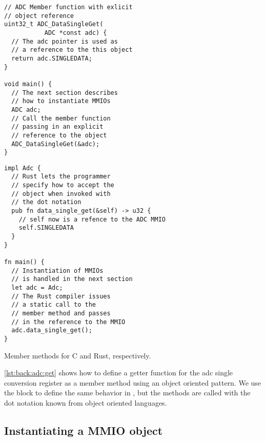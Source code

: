 \begin{listing}[H]
  \centering
  \begin{minipage}{0.47\textwidth}
  \begin{listing}
      \begin{verbatim}
// ADC Member function with exlicit
// object reference
uint32_t ADC_DataSingleGet(
           ADC *const adc) {
  // The adc pointer is used as
  // a reference to the this object
  return adc.SINGLEDATA;
}

void main() {
  // The next section describes
  // how to instantiate MMIOs
  ADC adc;
  // Call the member function
  // passing in an explicit
  // reference to the object
  ADC_DataSingleGet(&adc);
}
      \end{verbatim}
  \end{listing}
  \end{minipage}
  \hfill
  \begin{minipage}{0.47\textwidth}
  \begin{listing}
      \begin{verbatim}
impl Adc {
  // Rust lets the programmer
  // specify how to accept the
  // object when invoked with
  // the dot notation
  pub fn data_single_get(&self) -> u32 {
    // self now is a refence to the ADC MMIO
    self.SINGLEDATA
  }
}

fn main() {
  // Instantiation of MMIOs
  // is handled in the next section
  let adc = Adc;
  // The Rust compiler issues
  // a static call to the
  // member method and passes
  // in the reference to the MMIO
  adc.data_single_get();
}
      \end{verbatim}
  \end{listing}
  \end{minipage}
  \caption{Member methods for C and Rust, respectively.}
  \label{lst:back:adc:get}

\end{listing}

\autoref{lst:back:adc:get} shows how to define a getter function for the \gls{adc} single conversion register as a member method using an object oriented pattern.
We use the  block to define the same behavior in \rust, but the methods are called with the dot notation known from object oriented languages.

\subsection{Instantiating a MMIO object}

